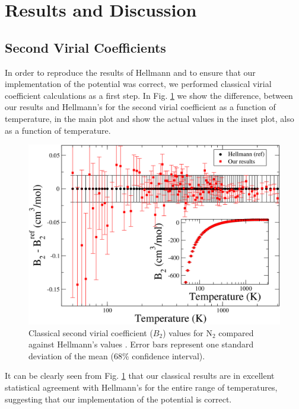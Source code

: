 \section{Results and Discussion}
    \subsection{Second Virial Coefficients}
        In order to reproduce the results of Hellmann and to ensure that our implementation of the \abinitio{} potential was correct, we performed classical virial coefficient calculations as a first step. In Fig. \ref{fig:B2CLN2} we show the difference, between our results and Hellmann's for the second virial coefficient as a function of temperature, in the main plot and show the actual values in the inset plot, also as a function of temperature.
        \begin{figure}[!htbp]
            \centering
            \includegraphics[scale=0.20,keepaspectratio]{Chapter-5/Figures/B2CL9sResults.png}
            \caption{Classical second virial coefficient ($B_2$) values for N$_2$ compared against Hellmann's values \cite{Hellmann2013}. Error bars represent one standard deviation of the mean (68\% confidence interval). }
            \label{fig:B2CLN2}
        \end{figure}
        It can be clearly seen from Fig. \ref{fig:B2CLN2} that our classical results are in excellent statistical agreement with Hellmann's for the entire range of temperatures, suggesting that our implementation of the \abinitio{} potential is correct.

